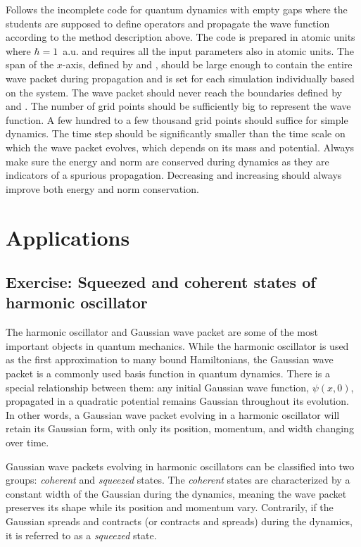 Follows the incomplete code for quantum dynamics with empty gaps where the students are supposed to define operators and propagate the wave function according to the method description above. The code is prepared in atomic units where $\hbar=1$~a.u. and requires all the input parameters also in atomic units. The span of the $x$-axis, defined by  and , should be large enough to contain the entire wave packet during propagation and is set for each simulation individually based on the system. The wave packet should never reach the boundaries defined by  and . The number of grid points should be sufficiently big to represent the wave function. A few hundred to a few thousand grid points should suffice for simple dynamics. The time step  should be significantly smaller than the time scale on which the wave packet evolves, which depends on its mass and potential. Always make sure the energy and norm are conserved during dynamics as they are indicators of a spurious propagation. Decreasing  and increasing  should always improve both energy and norm conservation. 

\lstset{style=mystyle}


\section{Applications}

\subsection*{Exercise: Squeezed and coherent states of harmonic oscillator}

The harmonic oscillator and Gaussian wave packet are some of the most important objects in quantum mechanics. While the harmonic oscillator is used as the first approximation to many bound Hamiltonians, the Gaussian wave packet is a commonly used basis function in quantum dynamics. There is a special relationship between them: any initial Gaussian wave function, $\psi(x,0)$, propagated in a quadratic potential remains Gaussian throughout its evolution. In other words, a Gaussian wave packet evolving in a harmonic oscillator will retain its Gaussian form, with only its position, momentum, and width changing over time.

Gaussian wave packets evolving in harmonic oscillators can be classified into two groups: \textit{coherent} and \textit{squeezed} states. The \textit{coherent} states are characterized by a constant width of the Gaussian during the dynamics, meaning the wave packet preserves its shape while its position and momentum vary. Contrarily, if the Gaussian spreads and contracts (or contracts and spreads) during the dynamics, it is referred to as a \textit{squeezed} state.

